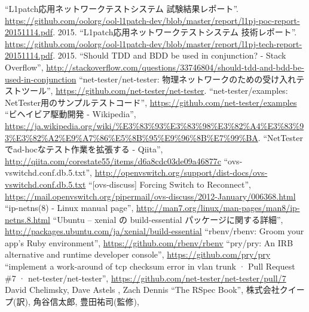 
\begin{thebibliography}{99}
         ``L1patch応用ネットワークテストシステム 試験結果レポート''.
         \url{https://github.com/oolorg/ool-l1patch-dev/blob/master/report/l1pj-poc-report-20151114.pdf}.
         2015.
         ``L1patch応用ネットワークテストシステム 技術レポート''.
         \url{https://github.com/oolorg/ool-l1patch-dev/blob/master/report/l1pj-tech-report-20151114.pdf}.
         2015.
         ``Should TDD and BDD be used in conjunction? - Stack Overflow'',
         \url{http://stackoverflow.com/questions/33746804/should-tdd-and-bdd-be-used-in-conjunction}
         ``net-tester/net-tester: 物理ネットワークのための受け入れテストツール'',
         \url{https://github.com/net-tester/net-tester}.
         ``net-tester/examples: NetTester用のサンプルテストコード'',
         \url{https://github.com/net-tester/examples}
         ``ビヘイビア駆動開発 - Wikipedia'',
         \url{https://ja.wikipedia.org/wiki/%E3%83%93%E3%83%98%E3%82%A4%E3%83%93%E3%82%A2%E9%A7%86%E5%8B%95%E9%96%8B%E7%99%BA}.
         ``NetTesterでad-hocなテスト作業を拡張する - Qiita'',
         \url{http://qiita.com/corestate55/items/d6a8cdc03de09a46877c}
         ``ovs-vswitchd.conf.db.5.txt'',
         \url{http://openvswitch.org/support/dist-docs/ovs-vswitchd.conf.db.5.txt}
         ``[ovs-discuss] Forcing Switch to Reconnect'',
         \url{https://mail.openvswitch.org/pipermail/ovs-discuss/2012-January/006368.html}
         ``ip-netns(8) - Linux manual page'',
         \url{http://man7.org/linux/man-pages/man8/ip-netns.8.html}
         ``Ubuntu – xenial の build-essential パッケージに関する詳細'',
         \url{http://packages.ubuntu.com/ja/xenial/build-essential}
         ``rbenv/rbenv: Groom your app’s Ruby environment'',
         \url{https://github.com/rbenv/rbenv}
         ``pry/pry: An IRB alternative and runtime developer console'',
         \url{https://github.com/pry/pry}
  ``implement a work-around of tcp checksum
         error in vlan trunk · Pull Request \#7 ·
         net-tester/net-tester'',
         \url{https://github.com/net-tester/net-tester/pull/7}
  David Chelimsky, Dave Astels , Zach Dennis ``The
         RSpec Book'', 株式会社クイープ(訳), 角谷信太郎, 豊田祐司(監修),

\end{thebibliography}
